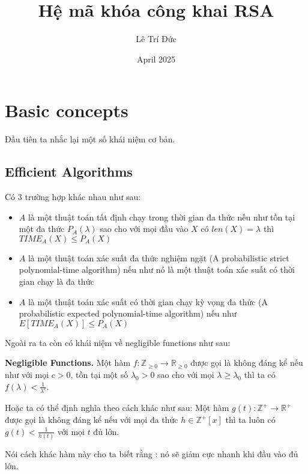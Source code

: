 \documentclass[12pt]{article}
\title{\textbf{Hệ mã khóa công khai RSA}}
\author{Lê Trí Đức }
\date{April 2025}
\begin{document}
\maketitle

\section{Basic concepts}

Đầu tiên ta nhắc lại một số khái niệm cơ bản. 

\subsection{Efficient Algorithms}
Có 3 trường hợp khác nhau như sau:
\begin{itemize}
\item $\displaystyle A$ là một thuật toán tất định chạy trong thời gian đa thức nếu như tồn tại một đa thức $\displaystyle P_{A}( \lambda )$ sao cho với mọi đầu vào $\displaystyle X$ có $\displaystyle len( X) =\lambda $ thì $\displaystyle TIME_{A}( X) \leqslant P_{A}( X)$
\item $\displaystyle A$ là một thuật toán xác suất đa thức nghiệm ngặt (A probabilistic strict polynomial-time algorithm) nếu như nó là một thuật toán xác suất có thời gian chạy là đa thức
\item $\displaystyle A$ là một thuật toán xác suất có thời gian chạy kỳ vọng đa thức (A probabilistic expected polynomial-time algorithm) nếu như $\displaystyle E[ TIME_{A}( X)] \leqslant P_{A}( X)$
\end{itemize}


Ngoài ra ta còn có khái niệm về negligible functions như sau:

\textbf{Negligible Functions.} Một hàm $\displaystyle f:\mathbb{Z}_{\geqslant 0}\rightarrow \mathbb{R}_{\geqslant 0}$ được gọi là không đáng kể nếu như với mọi $\displaystyle c >0$, tồn tại một số $\displaystyle \lambda _{0}  >0$ sao cho với mọi $\displaystyle \lambda \geqslant \lambda _{0}$ thì ta có $\displaystyle f( \lambda ) < \frac{1}{\lambda ^{c}}$.

Hoặc ta có thể định nghĩa theo cách khác như sau: Một hàm $\displaystyle g( t) :\mathbb{Z}^{+}\rightarrow \mathbb{R}^{+}$ được gọi là không đáng kể nếu với mọi đa thức $\displaystyle h\in \mathbb{Z}^{+}[ x]$ thì ta luôn có $\displaystyle g( t) < \frac{1}{h( t)}$ với mọi $\displaystyle t$ đủ lớn. 

Nói cách khác hàm này cho ta biết rằng : nó sẽ giảm cực nhanh khi đầu vào đủ lớn. 
\end{document}
